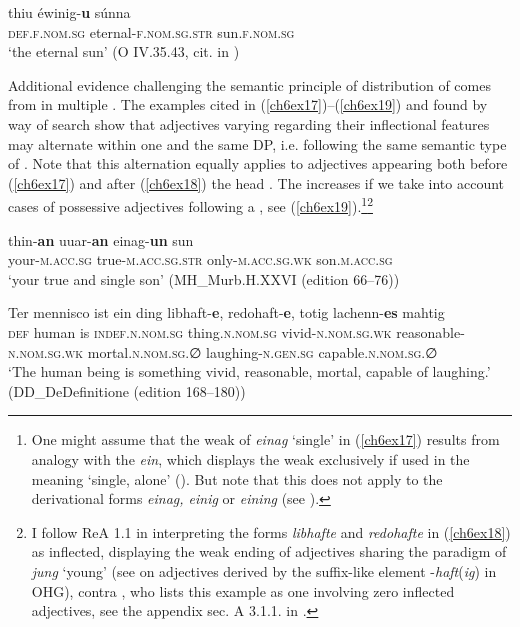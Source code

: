 \documentclass[output=paper,colorlinks,citecolor=brown]{langscibook}
\begin{document}
\begin{exe}
\ex\label{ch6ex16}
\gll thiu éwinig-\textbf{u} súnna\\
\textsc{def.f.nom.sg} eternal-\textsc{f.nom.sg.str} sun.\textsc{f.nom.sg} \\
\glt `the eternal sun' (O IV.35.43, cit. in \cite[69]{Heinrichs54})
\end{exe}

Additional evidence challenging the semantic principle of distribution
of  comes from  in multiple .
The examples cited in (\ref{ch6ex17})--(\ref{ch6ex19}) and found by way of  search show
that adjectives varying regarding their inflectional features may
alternate within one and the same DP, i.e. following the same semantic
type of . Note that this alternation equally applies to
adjectives appearing both before (\ref{ch6ex17}) and after (\ref{ch6ex18}) the head . The
 increases if we take into account cases of possessive
adjectives following a , see (\ref{ch6ex19}).\footnote{One might
  assume that the weak  of \emph{einag} `single' in (\ref{ch6ex17})
  results from analogy with the  \emph{ein}, which displays the
  weak  exclusively if used in the meaning `single, alone'
  (\citealp[322]{Braune2018AHD}). But note that this does not
  apply to the derivational forms \emph{einag, einig} or \emph{eining}
  (see \citealp[347]{Braune2018AHD}).}\footnote{I follow ReA 1.1 in interpreting
  the forms \emph{libhafte} and \emph{redohafte} in (\ref{ch6ex18}) as inflected,
  displaying the weak ending of adjectives sharing the paradigm of
  \emph{jung} `young' (see \citealp[305]{Braune2018AHD} on adjectives derived by the
  suffix-like element -\emph{haft}(\emph{ig}) in OHG), contra \citet{klein2007semantischen}, who lists this example as one involving zero inflected
  adjectives, see the appendix sec. A 3.1.1. in \citet[217]{klein2007semantischen}.}

\begin{exe}
\ex\label{ch6ex17}
\gll thin-\textbf{an} uuar-\textbf{an} einag-\textbf{un} sun\\
your-\textsc{m.acc.sg} true-\textsc{m.acc.sg.str} only-\textsc{m.acc.sg.wk} son.\textsc{m.acc.sg}\\
\glt  `your true and single son' (MH\_Murb.H.XXVI (edition 66--76))
\end{exe}

\begin{exe}
\ex\label{ch6ex18}
\gll Ter mennisco ist ein ding libhaft-\textbf{e}, redohaft-\textbf{e}, totig lachenn-\textbf{es} mahtig\\
 \textsc{def} human is \textsc{indef.n.nom.sg} thing.\textsc{n.nom.sg} vivid-\textsc{n.nom.sg.wk} reasonable-\textsc{n.nom.sg.wk} mortal.\textsc{n.nom.sg.∅} laughing-\textsc{n.gen.sg} capable.\textsc{n.nom.sg.∅}\\
\glt  `The human being is something vivid, reasonable, mortal, capable of
laughing.' (DD\_DeDefinitione (edition 168--180))
\end{exe}
\end{document}
